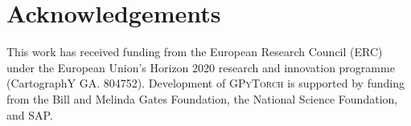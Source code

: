 \documentclass[fleqn,usenatbib]{mnras}
\begin{document}

%











\section*{Acknowledgements}
This work has received funding from the European Research Council (ERC) under the European Union’s Horizon 2020 research and innovation programme (CartographY GA. 804752).
Development of \textsc{GPyTorch} is supported by funding from the Bill and Melinda Gates Foundation, the National Science Foundation, and SAP.











%



\bsp	%
\label{lastpage}
\end{document}

